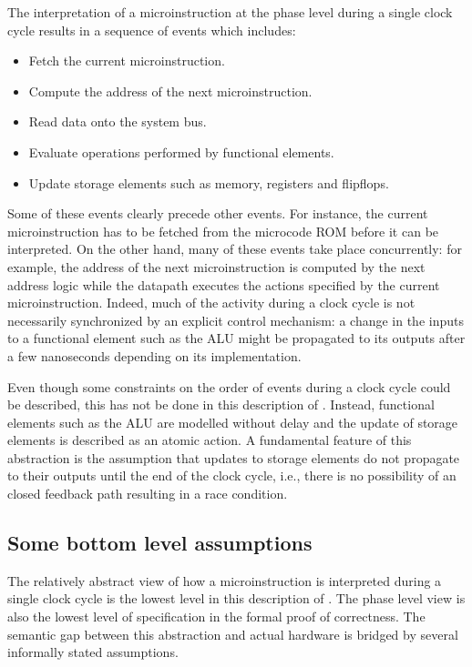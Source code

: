 The interpretation of a microinstruction at the phase level during
a single clock cycle results in a sequence of events which includes:

\begin{center}
\begin{itemize}
\item Fetch the current microinstruction.
\item Compute the address of the next microinstruction.
\item Read data onto the system bus.
\item Evaluate operations performed by functional elements.
\item Update storage elements such as memory, registers and flipflops.
\end{itemize}
\end{center}

Some of these events clearly precede other events.
For instance, the current microinstruction has to be fetched
from the microcode ROM before it can be interpreted.
On the other hand,
many of these events take place concurrently:
for example,
the address of the next microinstruction is computed by the
next address logic while the datapath executes the actions specified
by the current microinstruction.
Indeed, much of the activity during a clock cycle is not necessarily
synchronized by an explicit control mechanism:
a change in the inputs to
a functional element such as the ALU might be propagated to its outputs
after a few nanoseconds depending on its implementation.

Even though some constraints on the order of events
during a clock cycle could be described,
this has not be done in this description of \Tamarack.
Instead,
functional elements such as the ALU are modelled without delay
and the update of storage elements is described as an atomic action.
A fundamental feature
of this abstraction
is the assumption that
updates to storage elements do not propagate to their outputs
until the end of the clock cycle,
i.e., there is no possibility of an closed feedback path
resulting in a race condition.

\subsection{Some bottom level assumptions}
\label{sec-bottom}

The relatively abstract view of how a microinstruction is interpreted
during a single clock cycle is the lowest level in this
description of \Tamarack.
The phase level view is also the lowest level of specification in the
formal proof of correctness.
The semantic gap between this abstraction and actual hardware
is bridged by several informally stated assumptions.

